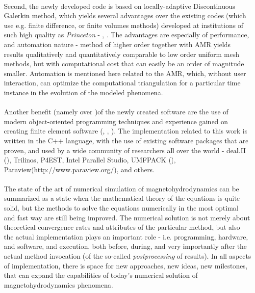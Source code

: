 \paragraph{}
Second, the newly developed code is based on locally-adaptive Discontinuous Galerkin method, which yields several advantages over the existing codes (which use e.g. finite difference, or finite volumes methods) developed at institutions of such high quality as \emph{Princeton} - \citep{athena}, \citep{zeus}. The advantages are especially of performance, and automation nature - method of higher order together with AMR yields results qualitatively and quantitatively comparable to low order uniform mesh methods, but with computational cost that can easily be an order of magnitude smaller. Automation is mentioned here related to the AMR, which, without user interaction, can optimize the computational triangulation for a particular time instance in the evolution of the modeled phenomena.
\paragraph{}
Another benefit (namely over \citep{zeus})of the newly created software are the use of modern object-oriented programming techniques and experience gained on creating finite element software (\citep{ja1}, \citep{ja2}, \citep{ja3}).
The implementation related to this work is written in the C++ language, with the use of existing software packages that are proven, and used by a wide community of researchers all over the world - deal.II (\citep{deal}), Trilinos, P4EST, Intel Parallel Studio, UMFPACK (\citep{umfpack}), Paraview(\url{http://www.paraview.org/}), and others.

\paragraph{}
The state of the art of numerical simulation of magnetohydrodynamics can be summarized as a state when the mathematical theory of the equations is quite solid, but the methods to solve the equations numerically in the most optimal and fast way are still being improved. The numerical solution is not merely about theoretical convergence rates and attributes of the particular method, but also the actual implementation plays an important role - i.e. programming, hardware, and software, and execution, both before, during, and very importantly after the actual method invocation (of the so-called \textit{postprocessing} of results). In all aspects of implementation, there is space for new approaches, new ideas, new milestones, that can expand the capabilities of today's numerical solution of magnetohydrodynamics phenomena.